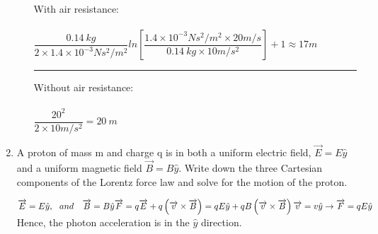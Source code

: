 \documentclass[fleqn]{article}
\begin{document}
\begin{enumerate}
\begin{enumerate}
        \textcolor{hwColor}{
          With air resistance: \\ \\
          $
            \dfrac{0.14 ~ kg}{2 \times 1.4 × 10^{-3}Ns^2/m^2} ln \left[\dfrac{1.4 × 10^{-3}Ns^2/m^2 \times 20 m/s}{0.14 ~ kg \times 10 m/s^2}\right]+1 \approx 17 m
          $
        }

        \textcolor{hwColor}{
          \rule{15cm}{1pt}
        }
      
        \textcolor{hwColor}{
          Without air resistance: \\ \\
          $
            \dfrac{20^2}{2 \times 10 m/s^2}=20 ~ m
          $
        }

    \end{enumerate}

    \item  A proton of mass m and charge q is in both a uniform electric field,
    $\overrightarrow{E}=E\hat{y}$ and a uniform magnetic field $\overrightarrow{B}=B\hat{y}$. Write down the three
    Cartesian components of the Lorentz force law and solve for the motion of the proton.

      \textcolor{hwColor}{
        $
          \overrightarrow{E}=E\hat{y}, ~~ and ~~~ \overrightarrow{B}=B\hat{y} \\
          \\
          \\
          \overrightarrow{F}=q\overrightarrow{E}+q\left(\overrightarrow{v} \times \overrightarrow{B}\right)=qE \hat{y}+qB\left(\overrightarrow{v} \times \overrightarrow{B}\right)\\
          \\
          \overrightarrow{v}=v \hat{y} \rightarrow \overrightarrow{F}=qE \hat{y} \\
          \\
        $
        Hence, the photon acceleration is in the $\hat{y}$ direction.
      }

  \end{enumerate}
\end{document}
